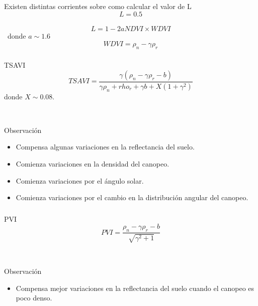 \documentclass[handout]{beamer}
\begin{document}
\begin{frame}
    \frametitle{\subsecname}
    Existen distintas corrientes sobre como calcular el valor de L
    \begin{equation}
        L=0.5
    \end{equation}\pause\
    \begin{equation}
        L = 1-2 a NDVI \times WDVI
    \end{equation}\pause\
    donde $a\sim 1.6$
    \begin{equation}
        WDVI = \rho_n -\gamma \rho_r
    \end{equation}
\end{frame}

\begin{frame}
    \frametitle{\subsecname}
    \begin{block}{TSAVI}
        \begin{equation}
            TSAVI =
            \frac{\gamma(\rho_n-\gamma\rho_r-b)}{\gamma\rho_n+rho_r+\gamma b
            +X(1+\gamma^2)} 
        \end{equation}
        donde $X\sim0.08$.
    \end{block}\pause\
    \begin{block}{Observación}
        \begin{itemize}[<+->]
            \item Compensa algunas variaciones en la reflectancia del suelo.
            \item Comienza variaciones en la densidad del canopeo.
            \item Comienza variaciones por el ángulo solar.
            \item Comienza variaciones por el cambio en la distribución
                angular del canopeo.
        \end{itemize}
    \end{block}
\end{frame}

\begin{frame}
    \frametitle{\subsecname}
    \begin{block}{PVI}
        \begin{equation}
            PVI = \frac{\rho_n-\gamma\rho_r-b}{\sqrt{\gamma^2+1}}
        \end{equation}
    \end{block}\pause\
    \begin{block}{Observación}
        \begin{itemize}
            \item Compensa mejor variaciones en la reflectancia del suelo cuando
                el canopeo es poco denso.
        \end{itemize}
    \end{block}
\end{frame}
\end{document}
